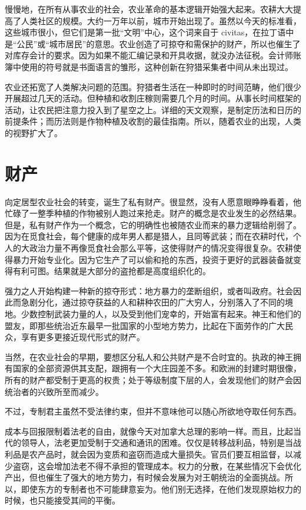 慢慢地，在所有从事农业的社会，农业革命的基本逻辑开始强大起来。农耕大大提高了人类社区的规模。大约一万年以前，城市开始出现了。虽然以今天的标准看，这些城市很小，但它们是第一批“文明”中心，这个词来自于 civitas，在拉丁语中是“公民”或“城市居民”的意思。农业创造了可掠夺和需保护的财产，所以也催生了对库存会计的要求。因为如果不能汇编记录和开具收据，就没办法征税。会计师账簿中使用的符号就是书面语言的雏形，这种创新在狩猎采集者中间从未出现过。

农业还拓宽了人类解决问题的范围。狩猎者生活在一种即时的时间范畴，他们很少开展超过几天的活动。但种植和收割庄稼则需要几个月的时间。从事长时间框架的活动，让农民把注意力投入到了星空之上。详细的天文观察，是制定历法和日历的前提条件；而历法则是作物种植及收割的最佳指南。所以，随着农业的出现，人类的视野扩大了。

\section{财产}
向定居型农业社会的转变，诞生了私有财产。很显然，没有人愿意眼睁睁看着，他忙碌了一整季种植的作物被别人跑过来抢走。财产的概念是农业发生的必然结果。但是，私有财产作为一个概念，它的明确性也被随农业而来的暴力逻辑给削弱了。因为在觅食社会，每个健康的成年男人都是猎人，且同等武装；而在农耕时代，个人的大政治力量不再像觅食社会那么平等，这使得财产的情况变得很复杂。农耕使得暴力开始专业化。因为它生产了可以偷和抢的东西，投资于更好的武器装备就变得有利可图。结果就是大部分的盗抢都是高度组织化的。

强力之人开始构建一种新的掠夺形式：地方暴力的垄断组织，或者叫政府。社会因此而急剧分化，通过掠夺获益的人和耕种农田的广大穷人，分别落入了不同的境地。少数控制武装力量的人，以及受到他们宠幸的，开始富有起来。神王和他们的盟友，即那些统治近东最早一批国家的小型地方势力，比起在下面劳作的广大民众，享有更多更接近现代形式的财产。

当然，在农业社会的早期，要想区分私人和公共财产是不合时宜的。执政的神王拥有国家的全部资源供其支配，跟拥有一个大庄园差不多。和欧洲的封建时期很像，所有的财产都受制于更高的权贵；处于等级制度下层的人，会发现他们的财产会因统治者的兴致所至而减少。

不过，专制君主虽然不受法律约束，但并不意味他可以随心所欲地夺取任何东西。

成本与回报限制着法老的自由，就像今天对加拿大总理的影响一样。而且，比起当代的领导人，法老更加受制于交通和通讯的困难。仅仅是转移战利品，特别是当战利品是农产品时，就会因为变质和盗窃而造成大量损失。官员们要互相监督，以减少盗窃，这会增加法老不得不承担的管理成本。权力的分散，在某些情况下会优化产出，但也催生了强大的地方势力，有时候会发展为对王朝统治的全面挑战。所以，即使东方的专制者也不可能肆意妄为。他们别无选择，在他们发现原始权力的时候，也只能接受其间的平衡。

